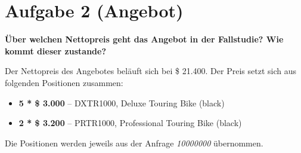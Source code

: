 \section{Aufgabe 2 (Angebot)}
\textbf{Über welchen Nettopreis geht das Angebot in der Fallstudie? Wie kommt dieser zustande?}

Der Nettopreis des Angebotes beläuft sich bei \$ 21.400.
Der Preis setzt sich aus folgenden Positionen zusammen:

\begin{itemize}
  \item \textbf{5 * \$ 3.000} -- DXTR1000, Deluxe Touring Bike (black)
  \item \textbf{2 * \$ 3.200} -- PRTR1000, Professional Touring Bike (black)
\end{itemize}

Die Positionen werden jeweils aus der Anfrage \textit{10000000} übernommen.

\clearpage